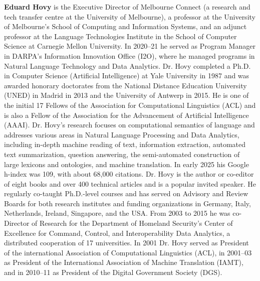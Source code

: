 \textbf{Eduard Hovy} is the Executive Director of Melbourne Connect (a research and tech transfer centre at the University of Melbourne), a professor at the University of Melbourne’s School of Computing and Information Systems, and an adjunct professor at the Language Technologies Institute in the School of Computer Science at Carnegie Mellon University.  In 2020–21 he served as Program Manager in DARPA’s Information Innovation Office (I2O), where he managed programs in Natural Language Technology and Data Analytics.  Dr. Hovy completed a Ph.D. in Computer Science (Artificial Intelligence) at Yale University in 1987 and was awarded honorary doctorates from the National Distance Education University (UNED) in Madrid in 2013 and the University of Antwerp in 2015.  He is one of the initial 17 Fellows of the Association for Computational Linguistics (ACL) and is also a Fellow of the Association for the Advancement of Artificial Intelligence (AAAI). Dr. Hovy’s research focuses on computational semantics of language and addresses various areas in Natural Language Processing and Data Analytics, including in-depth machine reading of text, information extraction, automated text summarization, question answering, the semi-automated construction of large lexicons and ontologies, and machine translation.  In early 2025 his Google h-index was 109, with about 68,000 citations. Dr. Hovy is the author or co-editor of eight books and over 400 technical articles and is a popular invited speaker.  He regularly co-taught Ph.D.-level courses and has served on Advisory and Review Boards for both research institutes and funding organizations in Germany, Italy, Netherlands, Ireland, Singapore, and the USA. From 2003 to 2015 he was co-Director of Research for the Department of Homeland Security’s Center of Excellence for Command, Control, and Interoperability Data Analytics, a distributed cooperation of 17 universities.  In 2001 Dr. Hovy served as President of the international Association of Computational Linguistics (ACL), in 2001–03 as President of the International Association of Machine Translation (IAMT), and in 2010–11 as President of the Digital Government Society (DGS).  



\clearpage
